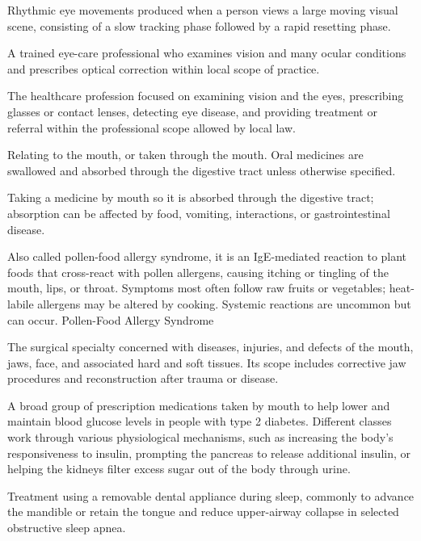  Rhythmic eye movements produced when a person views a large moving visual scene, consisting of a slow tracking phase followed by a rapid resetting phase.

 A trained eye-care professional who examines vision and many ocular conditions and prescribes optical correction within local scope of practice.

 The healthcare profession focused on examining vision and the eyes, prescribing glasses or contact lenses, detecting eye disease, and providing treatment or referral within the professional scope allowed by local law.

 Relating to the mouth, or taken through the mouth. Oral medicines are swallowed and absorbed through the digestive tract unless otherwise specified.

 Taking a medicine by mouth so it is absorbed through the digestive tract; absorption can be affected by food, vomiting, interactions, or gastrointestinal disease.

 Also called pollen-food allergy syndrome, it is an
IgE-mediated reaction to plant foods that cross-react with pollen allergens, causing
itching or tingling of the mouth, lips, or throat. Symptoms most often follow raw
fruits or vegetables; heat-labile allergens may be altered by cooking. Systemic
reactions are uncommon but can occur.
\synonyms
Pollen-Food Allergy Syndrome

 The surgical specialty concerned with diseases, injuries, and defects of the mouth, jaws, face, and associated hard and soft tissues. Its scope includes corrective jaw procedures and reconstruction after trauma or disease.

 A broad group of prescription medications taken by mouth to help lower and maintain blood glucose levels in people with type 2 diabetes. Different classes work through various physiological mechanisms, such as increasing the body's responsiveness to insulin, prompting the pancreas to release additional insulin, or helping the kidneys filter excess sugar out of the body through urine.

 Treatment using a removable dental appliance during sleep, commonly to advance the mandible or retain the tongue and reduce upper-airway collapse in selected obstructive sleep apnea.

